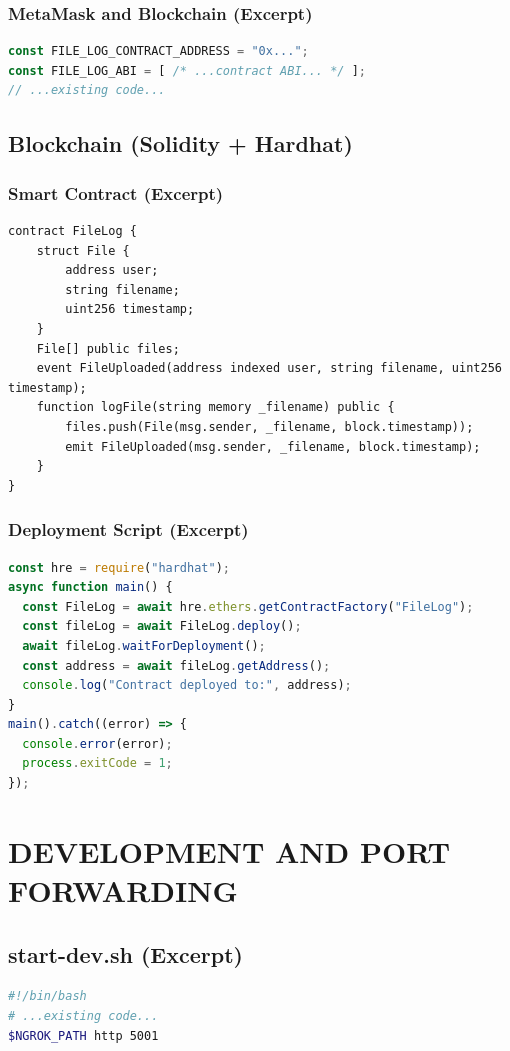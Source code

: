 \documentclass[a4paper, 12pt]{report}
\newenvironment{frontmatter}{}{}
\begin{document}
\begin{frontmatter}
\subsection{MetaMask and Blockchain (Excerpt)}
\begin{lstlisting}[language=JavaScript,caption={MetaMask and Contract ABI}]
const FILE_LOG_CONTRACT_ADDRESS = "0x...";
const FILE_LOG_ABI = [ /* ...contract ABI... */ ];
// ...existing code...
\end{lstlisting}

\section{Blockchain (Solidity + Hardhat)}
\subsection{Smart Contract (Excerpt)}
\begin{lstlisting}[language=Solidity,caption={blockchain/contracts/FileLog.sol}]
contract FileLog {
    struct File {
        address user;
        string filename;
        uint256 timestamp;
    }
    File[] public files;
    event FileUploaded(address indexed user, string filename, uint256 timestamp);
    function logFile(string memory _filename) public {
        files.push(File(msg.sender, _filename, block.timestamp));
        emit FileUploaded(msg.sender, _filename, block.timestamp);
    }
}
\end{lstlisting}

\subsection{Deployment Script (Excerpt)}
\begin{lstlisting}[language=JavaScript,caption={blockchain/scripts/deploy.js}]
const hre = require("hardhat");
async function main() {
  const FileLog = await hre.ethers.getContractFactory("FileLog");
  const fileLog = await FileLog.deploy();
  await fileLog.waitForDeployment();
  const address = await fileLog.getAddress();
  console.log("Contract deployed to:", address);
}
main().catch((error) => {
  console.error(error);
  process.exitCode = 1;
});
\end{lstlisting}

\chapter{DEVELOPMENT AND PORT FORWARDING}
\section{start-dev.sh (Excerpt)}
\begin{lstlisting}[language=bash,caption={start-dev.sh}]
#!/bin/bash
# ...existing code...
$NGROK_PATH http 5001
\end{lstlisting}


\end{frontmatter}
\end{document}
